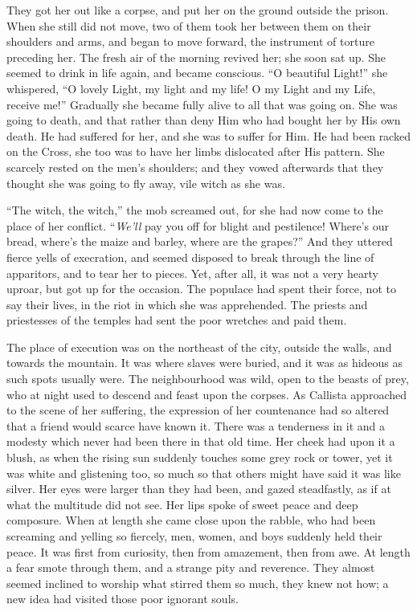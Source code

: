 They got her out like a corpse, and put her on the ground outside
the prison. When she still did not move, two of them took her between
them on their shoulders and arms, and began to move forward, the
instrument of torture preceding her. The fresh air of the morning
revived her; she soon sat up. She seemed to drink in life again, and
became conscious. ``O beautiful Light!'' she whispered,
``O lovely Light, my light and my life! O my Light and my Life,
receive me!'' Gradually she became fully alive to all that was
going on. She was going to death, and that rather than deny Him who
had bought her by His own death. He had suffered for her, and she was
to suffer for Him. He had been racked on the Cross, she too was to
have her limbs dislocated after His pattern. She scarcely rested on
the men's shoulders; and they vowed afterwards that they thought she
was going to fly away, vile witch as she was.

``The witch, the witch,'' the mob screamed out, for she had
now come to the place of her conflict. ``\emph{We'll} pay you off
for blight and pestilence! Where's our bread, where's the maize and
barley, where are the grapes?'' And they uttered fierce yells
of execration, and seemed disposed to break through the line of
apparitors, and to tear her to pieces. Yet, after all, it was not a
very hearty uproar, but got up for the occasion. The populace had
spent their force, not to say their lives, in the riot in which she
was apprehended. The priests and priestesses of the temples had sent
the poor wretches and paid them.

The place of execution was on the northeast of the city, outside
the walls, and towards the mountain. It was where slaves were buried,
and it was as hideous as such spots usually were. The neighbourhood
was wild, open to the beasts of prey, who at night used to descend and
feast upon the corpses. As Callista approached to the scene of her
suffering, the expression of her countenance had so altered that a
friend would scarce have known it. There was a tenderness in it and a
modesty which never had been there in that old time. Her cheek had
upon it a blush, as when the rising sun suddenly touches some grey
rock or tower, yet it was white and glistening too, so much so that
others might have said it was like silver. Her eyes were larger than
they had been, and gazed steadfastly, as if at what the multitude did
not see. Her lips spoke of sweet peace and deep composure. When at
length she came close upon the rabble, who had been screaming and
yelling so fiercely, men, women, and boys suddenly held their peace.
It was first from curiosity, then from amazement, then from awe. At
length a fear smote through them, and a strange pity and
reverence. They almost seemed inclined to worship what stirred them so
much, they knew not how; a new idea had visited those poor ignorant
souls.


